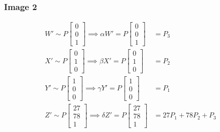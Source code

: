 \documentclass[12pt, oneside]{article}
\begin{document}
\subsubsection*{Image 2} 

\begin{align*}
    W' \sim P
     \begin{bmatrix}
    0   \\
    0   \\
    1  
    \end{bmatrix} \implies 
    \alpha W' = P
     \begin{bmatrix}
    0   \\
    0   \\
    1  
    \end{bmatrix}  &= P_3 \\
    X' \sim P
     \begin{bmatrix}
    0   \\
    1   \\
    0  
    \end{bmatrix} \implies 
    \beta X' = P
     \begin{bmatrix}
    0   \\
    1   \\
    0  
    \end{bmatrix}  &= P_2 \\
    Y' \sim P
     \begin{bmatrix}
    1   \\
    0   \\
    0  
    \end{bmatrix} \implies 
    \gamma Y' = P
     \begin{bmatrix}
    1   \\
    0   \\
    0  
    \end{bmatrix}   &= P_1 \\
    Z' \sim P
     \begin{bmatrix}
    27   \\
    78   \\
    1  
    \end{bmatrix} \implies 
    \delta Z' = P
     \begin{bmatrix}
    27   \\
    78   \\
    1  
    \end{bmatrix}   &= 27 P_1 + 78 P_2 + P_3
    \end{align*}
    
\end{document}

